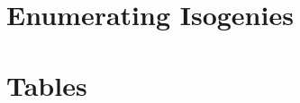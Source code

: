 \documentclass{article}
\begin{document}
\section{Enumerating Isogenies}%
\label{sec:enum_isogenies}

\section{Tables}




\end{document}
